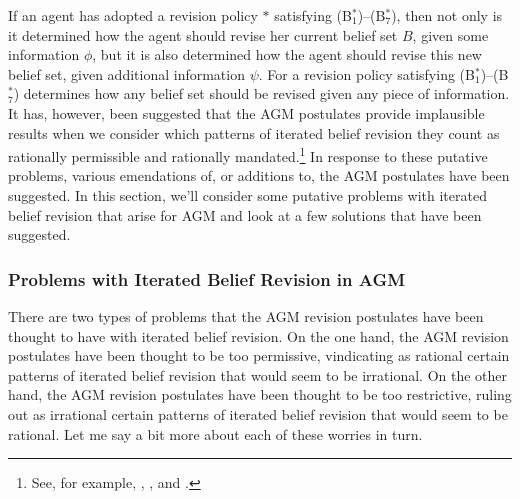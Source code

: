 If an agent has adopted a revision policy $*$ satisfying (B$^*_1$)--(B$^*_7$),  then not only is it determined how the agent should revise her current belief set $B$, given some information $\phi$, but it is also determined how the agent should revise this new belief set, given additional information $\psi$.
For a revision policy satisfying (B$^*_1$)--(B$^*_7$) determines how any belief set should be revised given any piece of information.
It has, however, been suggested that the AGM postulates provide implausible results when we consider which patterns of iterated belief revision they count as rationally permissible and rationally mandated.\footnote{See, for example, \citet{Boutilier1}, \citet{DarwichePearle}, and \citet{Stalnaker1}.}
In response to these putative problems, various emendations of, or additions to, the AGM postulates have been suggested.
In this section, we'll consider some putative problems with iterated belief revision that arise for AGM and look at a few solutions that have been suggested.



\subsubsection{Problems with Iterated Belief Revision in AGM}\label{caie-section2-4-1}

There are two types of problems that the AGM revision postulates have been thought to have with iterated belief revision.
On the one hand, the AGM revision postulates have been thought to be too permissive, vindicating as rational certain patterns of iterated belief revision that would seem to be irrational.
On the other hand, the AGM revision postulates have been thought to be too restrictive, ruling out as irrational certain patterns of iterated belief revision that would seem to be rational.
Let me say a bit more about each of these worries in turn.



